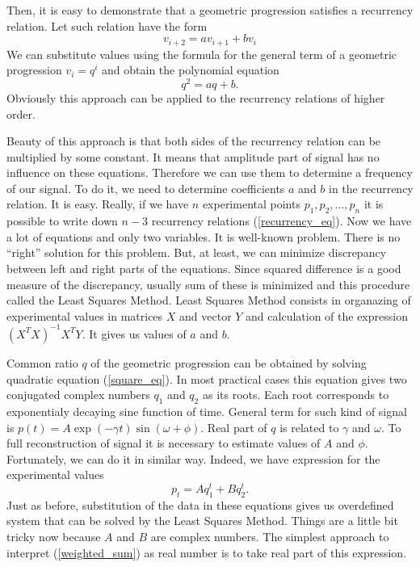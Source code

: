 \documentclass[14pt]{extarticle}
\begin{document}
Then, it is easy to demonstrate that a geometric progression satisfies a recurrency relation.
%
Let such relation have the form 
\begin{equation}
 v_{i+2} = a v_{i+1} + b v_{i}
 \label{recurrency_eq}
\end{equation} 
%
We can substitute values using the
formula for the general term of a geometric progression \(v_i = q^i\) and obtain the polynomial equation
\begin{equation}
q^2 = a q + b.
\label{square_eq}
\end{equation}
%
Obviously this approach can be applied to the recurrency relations of
higher order.

\newpage
Beauty of this approach is that both sides of the recurrency relation can be multiplied by some
constant. 
%
It means that amplitude part of signal has no influence on these equations.
%
Therefore we can use them to determine a frequency of our signal.
%
To do it, we need to determine coefficients \(a\) and \(b\) in the recurrency relation.
%
It is easy.
%
Really, if we have \(n\) experimental points \(p_1, p_2, \ldots, p_n\) it is possible to write  
down \(n-3\) recurrency relations (\ref{recurrency_eq}).
%
Now we have a lot of equations and only two variables. 
%
It is well-known problem. 
%
There is no ``right'' solution for this problem.
%
But, at least, we can minimize discrepancy between left and right
parts of the equations.
%
Since squared difference is a good measure of the discrepancy, usually
sum of these is minimized and this procedure called the Least Squares Method.
%
Least Squares Method consists in organazing of experimental values in matrices \(X\) and vector \(Y\)
and calculation of the expression \((X^T X)^{-1}X^T Y\).
%
It gives us values of \(a\) and \(b\).

Common ratio \(q\) of the geometric progression can be obtained by solving quadratic
equation (\ref{square_eq}).
%
In most practical cases this equation gives two conjugated complex numbers \(q_1\) and \(q_2\) as its roots.
%
Each root corresponds to exponentialy decaying sine function of time.
%
General term for such kind of signal is \(p(t) = A \exp (-\gamma t) \sin (\omega + \phi)\).
%
Real part of \(q\) is related to \(\gamma\) and \(\omega\).
To full reconstruction of signal it is necessary to estimate values of \(A\) and
\(\phi\).
%
Fortunately, we can do it in similar way.
%
Indeed, we have expression for the experimental values
\begin{equation}
    p_t = A q_1^t + B q_2^t.
    \label{weighted_sum}
\end{equation}
%
Just as before, substitution of the data in these equations gives us overdefined system
that can be solved by the Least Squares Method.
%
Things are a little bit tricky now because \(A\) and \(B\) are complex numbers.
%
The simplest approach to interpret (\ref{weighted_sum}) as real number is to take
real part of this expression.
%
\end{document}
